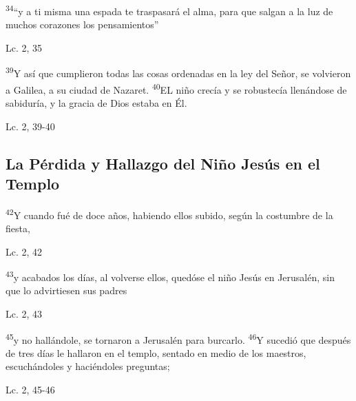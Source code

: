 \documentclass[a4paper,11pt]{article}
\begin{document}
      \begin{center}
        \textsuperscript{34}``y a ti misma una espada te traspasará el alma, para que salgan a la luz de muchos corazones los pensamientos''
      \end{center}
      \begin{center}
        Lc. 2, 35         
      \end{center}      
      
      \begin{center}
        \textsuperscript{39}Y así que cumplieron todas las cosas ordenadas en la ley del Señor, se volvieron a Galilea, a su ciudad de Nazaret. \textsuperscript{40}EL niño crecía
        y se robustecía llenándose de sabiduría, y la gracia de Dios estaba en Él.
      \end{center}
      \begin{center}
        Lc. 2, 39-40         
      \end{center}
            
    \subsection*{\hfil La Pérdida y Hallazgo del Niño Jesús en el Templo \hfil}
      
      \begin{center}
        \textsuperscript{42}Y cuando fué de doce años, habiendo ellos subido, según la costumbre de la fiesta,
      \end{center}
      \begin{center}
        Lc. 2, 42     
      \end{center}
      
      \begin{center}
        \textsuperscript{43}y acabados los días, al volverse ellos, quedóse el niño Jesús en Jerusalén, sin que lo advirtiesen sus padres
      \end{center}
      \begin{center}
        Lc. 2, 43        
      \end{center}
      
      \begin{center}
        \textsuperscript{45}y no hallándole, se tornaron a Jerusalén para burcarlo. \textsuperscript{46}Y sucedió que después de tres días le hallaron en el templo,
        sentado en medio de los maestros, escuchándoles y haciéndoles preguntas;
      \end{center}
      \begin{center}
        Lc. 2, 45-46       
      \end{center}
      
\end{document}
